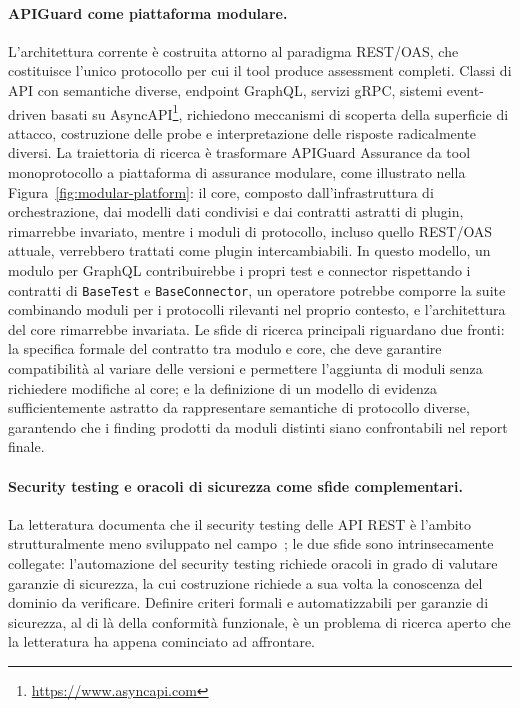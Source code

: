 \paragraph{APIGuard come piattaforma modulare.}
L'architettura corrente è costruita attorno al paradigma \gls{REST}/\gls{OAS}, che costituisce l'unico protocollo per cui il tool produce assessment completi. Classi di \gls{API} con semantiche diverse, endpoint GraphQL, servizi gRPC, sistemi event-driven basati su AsyncAPI\footnote{\url{https://www.asyncapi.com}}, richiedono meccanismi di scoperta della superficie di attacco, costruzione delle probe e interpretazione delle risposte radicalmente diversi. La traiettoria di ricerca è trasformare APIGuard Assurance da tool monoprotocollo a piattaforma di assurance modulare, come illustrato nella Figura~\ref{fig:modular-platform}: il core, composto dall'infrastruttura di orchestrazione, dai modelli dati condivisi e dai contratti astratti di plugin, rimarrebbe invariato, mentre i moduli di protocollo, incluso quello \gls{REST}/\gls{OAS} attuale, verrebbero trattati come plugin intercambiabili. In questo modello, un modulo per GraphQL contribuirebbe i propri test e connector rispettando i contratti di \texttt{BaseTest} e \texttt{BaseConnector}, un operatore potrebbe comporre la suite combinando moduli per i protocolli rilevanti nel proprio contesto, e l'architettura del core rimarrebbe invariata. Le sfide di ricerca principali riguardano due fronti: la specifica formale del contratto tra modulo e core, che deve garantire compatibilità al variare delle versioni e permettere l'aggiunta di moduli senza richiedere modifiche al core; e la definizione di un modello di evidenza sufficientemente astratto da rappresentare semantiche di protocollo diverse, garantendo che i finding prodotti da moduli distinti siano confrontabili nel report finale.



\paragraph{Security testing e oracoli di sicurezza come sfide complementari.}
La letteratura documenta che il security testing delle \gls{API} REST è l'ambito strutturalmente meno sviluppato nel campo~\cite{golmohammadiTestingRESTfulAPIs2023}; le due sfide sono intrinsecamente collegate: l'automazione del security testing richiede oracoli in grado di valutare garanzie di sicurezza, la cui costruzione richiede a sua volta la conoscenza del dominio da verificare. Definire criteri formali e automatizzabili per garanzie di sicurezza, al di là della conformità funzionale, è un problema di ricerca aperto che la letteratura ha appena cominciato ad affrontare.

